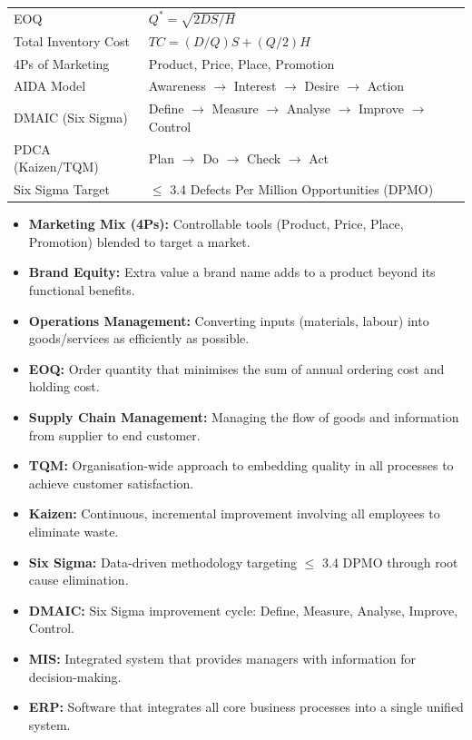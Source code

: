 \documentclass[12pt,a4paper]{article}
\renewcommand{\arraystretch}{1.45}
\begin{document}
\begin{tcolorbox}[formulabox, title={\textbf{Key Formulas and Frameworks at a Glance}}]
\renewcommand{\arraystretch}{1.3}
\begin{tabularx}{\linewidth}{B{4.2cm} X}EOQ & $Q^* = \sqrt{2DS/H}$ \\[4pt]
Total Inventory Cost & $TC = (D/Q)S + (Q/2)H$ \\[4pt]
4Ps of Marketing & Product, Price, Place, Promotion \\[3pt]
AIDA Model & Awareness $\to$ Interest $\to$ Desire $\to$ Action \\[3pt]
DMAIC (Six Sigma) & Define $\to$ Measure $\to$ Analyse $\to$ Improve $\to$ Control \\[3pt]
PDCA (Kaizen/TQM) & Plan $\to$ Do $\to$ Check $\to$ Act \\[3pt]
Six Sigma Target & $\leq$ 3.4 Defects Per Million Opportunities (DPMO) \\
\end{tabularx}
\end{tcolorbox}

\begin{tcolorbox}[defbox, title={\textbf{One-Line Definitions}}]
\begin{itemize}[leftmargin=*, itemsep=2pt, topsep=0pt]
  \item \textbf{Marketing Mix (4Ps):} Controllable tools (Product, Price, Place, Promotion) blended to target a market.
  \item \textbf{Brand Equity:} Extra value a brand name adds to a product beyond its functional benefits.
  \item \textbf{Operations Management:} Converting inputs (materials, labour) into goods/services as efficiently as possible.
  \item \textbf{EOQ:} Order quantity that minimises the sum of annual ordering cost and holding cost.
  \item \textbf{Supply Chain Management:} Managing the flow of goods and information from supplier to end customer.
  \item \textbf{TQM:} Organisation-wide approach to embedding quality in all processes to achieve customer satisfaction.
  \item \textbf{Kaizen:} Continuous, incremental improvement involving all employees to eliminate waste.
  \item \textbf{Six Sigma:} Data-driven methodology targeting $\leq$ 3.4 DPMO through root cause elimination.
  \item \textbf{DMAIC:} Six Sigma improvement cycle: Define, Measure, Analyse, Improve, Control.
  \item \textbf{MIS:} Integrated system that provides managers with information for decision-making.
  \item \textbf{ERP:} Software that integrates all core business processes into a single unified system.
\end{itemize}
\end{tcolorbox}
\end{document}
